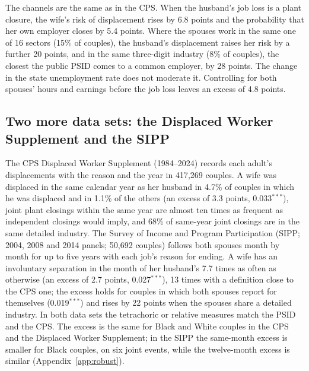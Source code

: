 The channels are the same as in the CPS. When the husband's job loss is a plant closure, the wife's risk of
displacement rises by 6.8 points and the probability that her own employer closes by 5.4 points. Where the spouses work
in the same one of 16 sectors (15\% of couples), the husband's displacement raises her risk by a further 20 points, and
in the same three-digit industry (8\% of couples), the closest the public PSID comes to a common employer, by 28 points.
The change in the state unemployment rate does not moderate it. Controlling for both spouses' hours and earnings before
the job loss leaves an excess of 4.8 points.

\subsection{Two more data sets: the Displaced Worker Supplement and the SIPP}

The CPS Displaced Worker Supplement (1984--2024) records each adult's displacements with the reason and the year in
417,269 couples. A wife was displaced in the same calendar year as her husband in 4.7\% of couples in which he was
displaced and in 1.1\% of the others (an excess of 3.3 points, 0.033$^{***}$), joint plant closings within the same year
are almost ten times as frequent as independent closings would imply, and 68\% of same-year joint closings are in the
same detailed industry. The Survey of Income and Program Participation (SIPP; 2004, 2008 and 2014 panels; 50,692
couples) follows both spouses month by month for up to five years with each job's reason for ending. A wife has an
involuntary separation in the month of her husband's 7.7 times as often as otherwise (an excess of 2.7 points,
0.027$^{***}$), 13 times with a definition close to the CPS one; the excess holds for couples in which both spouses
report for themselves (0.019$^{***}$) and rises by 22 points when the spouses share a detailed industry. In both data
sets the tetrachoric or relative measures match the PSID and the CPS. The excess is the same for Black and White
couples in the CPS and the Displaced Worker Supplement; in the SIPP the same-month excess is smaller for Black couples,
on six joint events, while the twelve-month excess is similar (Appendix~\ref{app:robust}).

